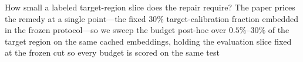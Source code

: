 \documentclass[preprint,11pt,authoryear]{elsarticle}
\begin{document}
How small a labeled target-region slice does the repair require? The paper prices the remedy at a
single point---the fixed $30\%$ target-calibration fraction embedded in the frozen protocol---so we
sweep the budget post-hoc over $0.5\%$--$30\%$ of the target region on the same cached embeddings,
holding the evaluation slice fixed at the frozen cut so every budget is scored on the same test
\end{document}
